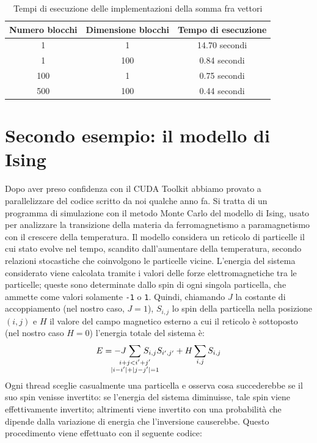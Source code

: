 \documentclass[a4paper,11pt]{article}
\begin{document}
\begin{table}[!ht]  
  \centering
    \begin{tabular}{c c| c }
     Numero blocchi & Dimensione blocchi & Tempo di esecuzione \\ \midrule
        1           & 1                  & 14.70 secondi       \\
        1           & 100                & 0.84 secondi        \\
        100         & 1                  & 0.75 secondi        \\
        500         & 100                & 0.44 secondi        \\
    \end{tabular}
    \caption{Tempi di esecuzione delle implementazioni della somma fra vettori}
    \label{tab:tempi_somma}
\end{table}

\section{Secondo esempio: il modello di Ising}
Dopo aver preso confidenza con il CUDA Toolkit abbiamo provato a parallelizzare del codice scritto da noi qualche anno fa. Si tratta di un programma di simulazione con il metodo Monte Carlo del modello di Ising, usato per analizzare la transizione della materia da ferromagnetismo a paramagnetismo con il crescere della temperatura.
Il modello considera un reticolo di particelle il cui stato evolve nel tempo, scandito dall'aumentare della temperatura, secondo relazioni stocastiche che coinvolgono le particelle vicine. L'energia del sistema considerato viene calcolata tramite i valori delle forze elettromagnetiche tra le particelle; queste sono determinate dallo spin di ogni singola particella, che ammette come valori solamente \texttt{-1} o \texttt{1}. Quindi, chiamando $J$ la costante di accoppiamento (nel nostro caso, $J=1$), $S_{i, j}$ lo spin della particella nella posizione $(i, j)$ e $H$ il valore del campo magnetico esterno a cui il reticolo è sottoposto (nel nostro caso $H=0$) l'energia totale del sistema è:
\begin{equation*}
    E = -J \hspace{-20px} \sum_{\substack{i+j<i'+j' \\ |i-i'| + |j-j'| = 1}} \hspace{-20px} S_{i, j} S_{i', j'} + H \sum_{i, j} S_{i, j}
\end{equation*}
Ogni thread sceglie casualmente una particella e osserva cosa succederebbe se il suo spin venisse invertito: se l'energia del sistema diminuisse, tale spin viene effettivamente invertito; altrimenti viene invertito con una probabilità che dipende dalla variazione di energia che l'inversione causerebbe. Questo procedimento viene effettuato con il seguente codice:
\end{document}
